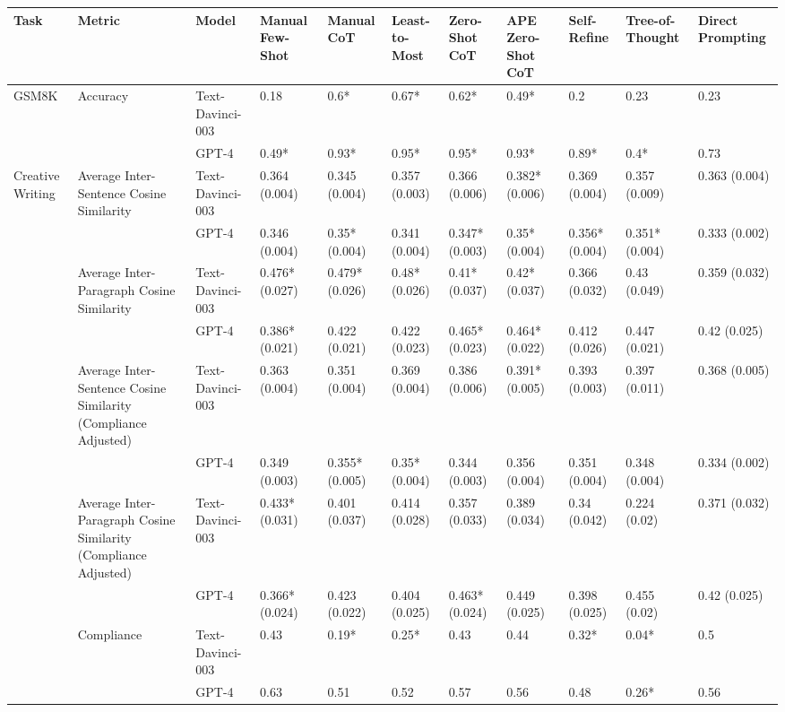 \begin{tabular}{lllllllllll}
\toprule
Task & Metric & Model & Manual Few-Shot & Manual CoT & Least-to-Most & Zero-Shot CoT & APE Zero-Shot CoT & Self-Refine & Tree-of-Thought & Direct Prompting \\
\midrule
GSM8K & Accuracy & Text-Davinci-003 & 0.18 & 0.6* & 0.67* & 0.62* & 0.49* & 0.2 & 0.23 & 0.23 \\
 &  & GPT-4 & 0.49* & 0.93* & 0.95* & 0.95* & 0.93* & 0.89* & 0.4* & 0.73 \\
Creative Writing & Average Inter-Sentence Cosine Similarity & Text-Davinci-003 & 0.364 (0.004) & 0.345 (0.004) & 0.357 (0.003) & 0.366 (0.006) & 0.382* (0.006) & 0.369 (0.004) & 0.357 (0.009) & 0.363 (0.004) \\
 &  & GPT-4 & 0.346 (0.004) & 0.35* (0.004) & 0.341 (0.004) & 0.347* (0.003) & 0.35* (0.004) & 0.356* (0.004) & 0.351* (0.004) & 0.333 (0.002) \\
 & Average Inter-Paragraph Cosine Similarity & Text-Davinci-003 & 0.476* (0.027) & 0.479* (0.026) & 0.48* (0.026) & 0.41* (0.037) & 0.42* (0.037) & 0.366 (0.032) & 0.43 (0.049) & 0.359 (0.032) \\
 &  & GPT-4 & 0.386* (0.021) & 0.422 (0.021) & 0.422 (0.023) & 0.465* (0.023) & 0.464* (0.022) & 0.412 (0.026) & 0.447 (0.021) & 0.42 (0.025) \\
 & Average Inter-Sentence Cosine Similarity (Compliance Adjusted) & Text-Davinci-003 & 0.363 (0.004) & 0.351 (0.004) & 0.369 (0.004) & 0.386 (0.006) & 0.391* (0.005) & 0.393 (0.003) & 0.397 (0.011) & 0.368 (0.005) \\
 &  & GPT-4 & 0.349 (0.003) & 0.355* (0.005) & 0.35* (0.004) & 0.344 (0.003) & 0.356 (0.004) & 0.351 (0.004) & 0.348 (0.004) & 0.334 (0.002) \\
 & Average Inter-Paragraph Cosine Similarity (Compliance Adjusted) & Text-Davinci-003 & 0.433* (0.031) & 0.401 (0.037) & 0.414 (0.028) & 0.357 (0.033) & 0.389 (0.034) & 0.34 (0.042) & 0.224 (0.02) & 0.371 (0.032) \\
 &  & GPT-4 & 0.366* (0.024) & 0.423 (0.022) & 0.404 (0.025) & 0.463* (0.024) & 0.449 (0.025) & 0.398 (0.025) & 0.455 (0.02) & 0.42 (0.025) \\
 & Compliance & Text-Davinci-003 & 0.43 & 0.19* & 0.25* & 0.43 & 0.44 & 0.32* & 0.04* & 0.5 \\
 &  & GPT-4 & 0.63 & 0.51 & 0.52 & 0.57 & 0.56 & 0.48 & 0.26* & 0.56 \\
\bottomrule
\end{tabular}
